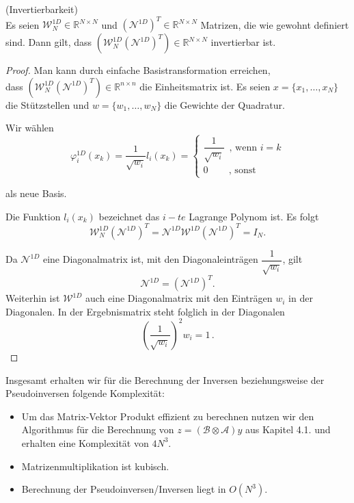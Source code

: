 \begin{Bemerkung} (Invertierbarkeit) \\ \label{bem:unit}
Es seien $\mathcal{W}_N^{1D} \in \mathbb{R}^{N \times N}$ und $(\mathcal{N}^{1D})^T \in \mathbb{R}^{N \times N}$ Matrizen, die wie gewohnt definiert sind. Dann gilt, dass $(\mathcal{W}_N^{1D} (\mathcal{N}^{1D})^T) \in \mathbb{R}^{N \times N}$ invertierbar ist.

\begin{proof}

Man kann durch einfache Basistransformation erreichen, \\ dass $(\mathcal{W}_N^{1D} (\mathcal{N}^{1D})^T) \in \mathbb{R}^{n \times n}$  die Einheitsmatrix ist. Es seien $x=\{x_1,\dots,x_N\}$ die Stützstellen und $w=\{w_1,\dots,w_N\}$ die Gewichte der Quadratur.

Wir wählen 
\begin{equation*}
\varphi^{1D}_i (x_k) = \dfrac{1}{ \sqrt{w_i} } l_i (x_k) = 
\begin{cases}
\dfrac{1}{ \sqrt{w_i} } \, \text{ , wenn } i=k  \\
0  \, \, \, \, \, \, \, \, \, \, \, \text{ , sonst }
\end{cases}
\end{equation*}

als neue Basis.

Die Funktion $l_i(x_k)$ bezeichnet das $i-te$ Lagrange Polynom ist.
Es folgt 
\begin{equation*}
\mathcal{W}_N^{1D} (\mathcal{N}^{1D})^T = \mathcal{N}^{1D} \mathcal{W}^{1D} (\mathcal{N}^{1D})^T = I_N.
\end{equation*}

Da $\mathcal{N}^{1D}$ eine Diagonalmatrix ist, mit den Diagonaleinträgen $\dfrac{1}{ \sqrt{w_i} }$, gilt $$\mathcal{N}^{1D}=(\mathcal{N}^{1D})^T.$$ Weiterhin ist $\mathcal{W}^{1D}$ auch eine Diagonalmatrix mit den Einträgen $w_i$ in der Diagonalen. In der Ergebnismatrix steht folglich in der Diagonalen 
\begin{equation*}
(\dfrac{1}{ \sqrt{w_i} })^2  w_i = 1 \, .
\end{equation*}
 
\end{proof}
\end{Bemerkung}
\newpage
Insgesamt erhalten wir für die Berechnung der Inversen beziehungsweise der Pseudoinversen folgende Komplexität:
\begin{itemize}
\item Um das Matrix-Vektor Produkt effizient zu berechnen nutzen wir den Algorithmus für die Berechnung von $z=(\mathcal{B} \otimes \mathcal{A})y$ aus Kapitel 4.1. und erhalten eine Komplexität von $4N^3$.

\item Matrizenmultiplikation ist kubisch.

\item Berechnung der Pseudoinversen/Inversen liegt in $O(N^3)$.

\end{itemize}

